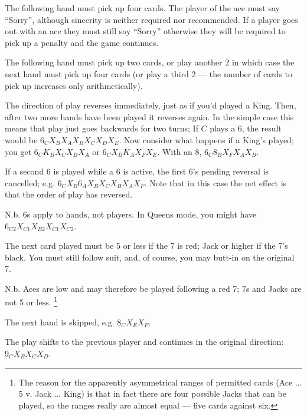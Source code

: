 \documentclass[12pt]{article}
\begin{document}
\begin{description}
\newcommand{\card}[1]{\hbox to 15mm{#1\hfil}}
\item[\card{Ace}] The following hand must pick up four cards.  The player of the ace must say ``Sorry'', although
  sincerity is neither required nor recommended.  If a player goes out with an ace they must still say ``Sorry''
  otherwise they will be required to pick up a penalty and the game continues.

  \item[\card{2}]
    The following hand must pick up two cards, or play another 2 in which case the next hand must
    pick up four cards (or play a third 2 --- the number of cards to pick up increases only arithmetically).

  \item[\card{6}]
    The direction of play reverses immediately, just as if you'd played a King.  Then, after two
    more hands have been played it reverses again.  In the simple case this means that play just goes backwards
    for two turns; If $C$ plays
    a 6, the result would be $6_C X_B X_A X_B X_C X_D X_E$.  Now consider what happens if a
    King's played;  you get $6_C K_B X_C X_B X_A$ or $6_C X_B K_A X_F X_E$.  With an 8,
    $6_C 8_B X_F X_A X_B$.

    If a second 6 is played while a 6 is active, the first 6's pending reversal is cancelled; e.g.  $6_C X_B
    6_A X_B X_C X_B X_A X_F$.  Note that in this case the net effect is that the order of play has reversed.

    N.b. 6s apply to hands, not players.  In Queens mode, you might have $6_{C2} X_{C1} X_{B2} X_{C1} X_{C2}$.

  \item[\card{7}] The next card played must be 5 or less if the 7 is red; Jack or higher if the 7's black. You
    must still follow suit, and, of course, you may butt-in on the original 7.
    
    N.b. Aces are low and may therefore be played following a red 7; 7s and Jacks are not 5 or less.%
    \footnote{The reason for the apparently asymmetrical ranges of permitted cards (Ace ... 5 v. Jack ... King)
    is that in fact there are four possible Jacks that can be played, so the ranges really are almost
    equal --- five cards against six.}

  \item[\card{8}]
    The next hand is skipped, e.g. $8_C X_E X_F$.

  \item[\card{9}]
    The play shifts to the previous player and continues in the original direction: $9_C X_B X_C X_D$.


\end{description}
\end{document}
